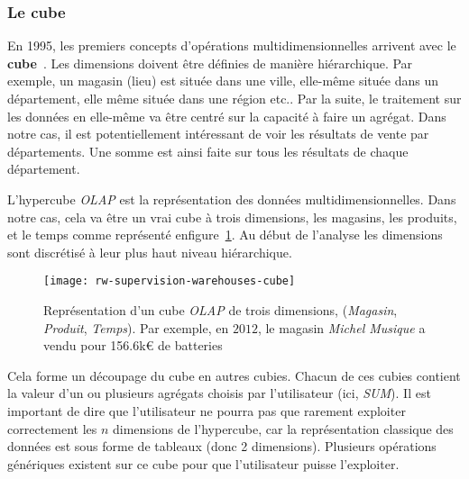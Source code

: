 \subsubsection{Le cube}
En 1995, les premiers concepts d'opérations multidimensionnelles arrivent avec le \textbf{cube}~\cite{Gray:cube}. Les dimensions doivent être définies de manière hiérarchique. Par exemple, un magasin (lieu) est située dans une ville, elle-même située dans un département, elle même située dans une région etc.. Par la suite, le traitement sur les données en elle-même va être centré sur la capacité à faire un agrégat. Dans notre cas, il est potentiellement intéressant de voir les résultats de vente par départements. Une somme est ainsi faite sur tous les résultats de chaque département.

L'hypercube \textit{OLAP} est la représentation des données multidimensionnelles. Dans notre cas, cela va être un vrai cube à trois dimensions, les magasins, les produits, et le temps comme représenté enfigure~\ref{fig:rw:supervision:warehouses:cube}. Au début de l'analyse les dimensions sont discrétisé à leur plus haut niveau hiérarchique.
\begin{figure}[ht]
	\centering
	\texttt{[image: rw-supervision-warehouses-cube]}
	\caption{Représentation d'un cube \textit{OLAP} de trois dimensions, (\textit{Magasin}, \textit{Produit}, \textit{Temps}). Par exemple, en $2012$, le magasin \textit{Michel Musique} a vendu pour 156.6k\euro{} de batteries}\label{fig:rw:supervision:warehouses:cube}
\end{figure}
Cela forme un découpage du cube en autres cubies. Chacun de ces cubies contient la valeur d'un ou plusieurs agrégats choisis par l'utilisateur (ici, \textit{SUM}). Il est important de dire que l'utilisateur ne pourra pas que rarement exploiter correctement les $n$ dimensions de l'hypercube, car la représentation classique des données est sous forme de tableaux (donc 2 dimensions). Plusieurs opérations génériques existent sur ce cube pour que l'utilisateur puisse l'exploiter.

